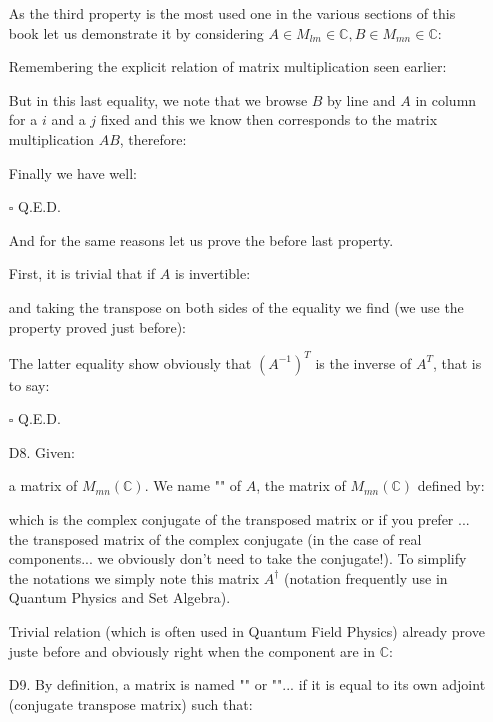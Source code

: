 \begin{enumerate}
		As the third property is the most used one in the various sections of this book let us demonstrate it by considering $A\in M_{lm}\in\mathbb{C},B\in M_{mn}\in \mathbb{C}$:
		\begin{dem}
		 Remembering the explicit relation of matrix multiplication seen earlier:
		
		But in this last equality, we note that we browse $B$ by line and $A$ in column for a $i$ and a $j$ fixed and this we know then corresponds to the matrix multiplication $AB$, therefore:
		
		Finally we have well:
		
		\begin{flushright}
			$\square$  Q.E.D.
		\end{flushright}
		\end{dem}
		And for the same reasons let us prove the before last property.
		\begin{dem}
		First, it is trivial that if $A$ is invertible:
		
		and taking the transpose on both sides of the equality we find (we use the property proved just before):
		
		The latter equality show obviously that $(A^{-1})^T$ is the inverse of $A^T$, that is to say:
		\begin{flushright}
			$\square$  Q.E.D.
		\end{flushright}
		\end{dem}
		
		\item[D8.] Given:
		
		a matrix of $M_{mn}(\mathbb{C})$. We name "\label{adjoint matrix}" of $A$, the matrix of $M_{mn}(\mathbb{C})$ defined by:
		
		which is the complex conjugate of the transposed matrix or if you prefer ... the transposed matrix of the complex conjugate (in the case of real components... we obviously don't need to take the conjugate!). To simplify the notations we simply note this matrix $A^\dagger$ (notation frequently use in Quantum Physics and Set Algebra).
		\begin{tcolorbox}[title=Remark,colframe=black,arc=10pt]
		Trivial relation (which is often used in Quantum Field Physics) already prove juste before and obviously right when the component are in $\mathbb{C}$:
		
		\end{tcolorbox}
		
		\item[D9.] By definition, a matrix is named "" or "\label{self-ajdoint matrix}"... if it is equal to its own adjoint (conjugate transpose matrix) such that:
		

\end{enumerate}
